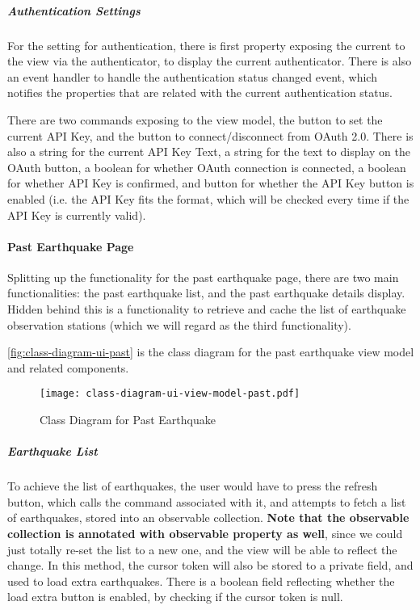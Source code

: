 \subparagraph{Authentication Settings}

For the setting for authentication, there is first property exposing the current  to the view via the authenticator, to display the current authenticator. There is also an event handler to handle the authentication status changed event, which notifies the properties that are related with the current authentication status.

There are two commands exposing to the view model, the button to set the current API Key, and the button to connect/disconnect from OAuth 2.0. There is also a string for the current API Key Text, a string for the text to display on the OAuth button, a boolean for whether OAuth connection is connected, a boolean for whether API Key is confirmed, and button for whether the API Key button is enabled (i.e. the API Key fits the format, which will be checked every time if the API Key is currently valid).

\paragraph{Past Earthquake Page}

Splitting up the functionality for the past earthquake page, there are two main functionalities: the past earthquake list, and the past earthquake details display. Hidden behind this is a functionality to retrieve and cache the list of earthquake observation stations (which we will regard as the third functionality).

\autoref{fig:class-diagram-ui-past} is the class diagram for the past earthquake view model and related components.

\begin{figure}[htp]
    \centering
    \texttt{[image: class-diagram-ui-view-model-past.pdf]}
    \caption{Class Diagram for Past Earthquake}
    \label{fig:class-diagram-ui-past}
\end{figure}

\subparagraph{Earthquake List}

To achieve the list of earthquakes, the user would have to press the refresh button, which calls the command associated with it, and attempts to fetch a list of earthquakes, stored into an observable collection. \textbf{Note that the observable collection is annotated with observable property as well}, since we could just totally re-set the list to a new one, and the view will be able to reflect the change. In this method, the cursor token will also be stored to a private field, and used to load extra earthquakes. There is a boolean field reflecting whether the load extra button is enabled, by checking if the cursor token is null.

